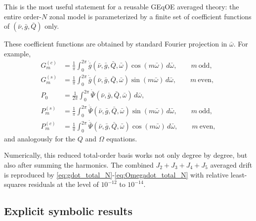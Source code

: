 \documentclass[11pt]{article}
\begin{document}
This is the most useful statement for a reusable GEqOE averaged theory: the
entire order-$N$ zonal model is parameterized by a finite set of coefficient
functions of $(\bar\nu,\bar g,\bar Q)$ only.

These coefficient functions are obtained by standard Fourier projection in
$\bar\omega$. For example,
\begin{align}
G^{(c)}_m
&=
\frac{1}{\pi}\int_0^{2\pi}
\dot{\bar g}(\bar\nu,\bar g,\bar Q,\bar\omega)\cos(m\bar\omega)\,d\bar\omega,
\qquad m\ \text{odd},
\label{eq:Gc_proj}\\
G^{(s)}_m
&=
\frac{1}{\pi}\int_0^{2\pi}
\dot{\bar g}(\bar\nu,\bar g,\bar Q,\bar\omega)\sin(m\bar\omega)\,d\bar\omega,
\qquad m\ \text{even},
\label{eq:Gs_proj}\\
P_0
&=
\frac{1}{2\pi}\int_0^{2\pi}
\dot{\bar\Psi}(\bar\nu,\bar g,\bar Q,\bar\omega)\,d\bar\omega,
\label{eq:P0_proj}\\
P^{(s)}_m
&=
\frac{1}{\pi}\int_0^{2\pi}
\dot{\bar\Psi}(\bar\nu,\bar g,\bar Q,\bar\omega)\sin(m\bar\omega)\,d\bar\omega,
\qquad m\ \text{odd},
\label{eq:Ps_proj}\\
P^{(c)}_m
&=
\frac{1}{\pi}\int_0^{2\pi}
\dot{\bar\Psi}(\bar\nu,\bar g,\bar Q,\bar\omega)\cos(m\bar\omega)\,d\bar\omega,
\qquad m\ \text{even},
\label{eq:Pc_proj}
\end{align}
and analogously for the $Q$ and $\Omega$ equations.

Numerically, this reduced total-order basis works not only degree by degree,
but also after summing the harmonics. The combined
$J_2+J_3+J_4+J_5$ averaged drift is reproduced by
\eqref{eq:gdot_total_N}-\eqref{eq:Omegadot_total_N} with relative least-squares
residuals at the level of $10^{-12}$ to $10^{-14}$.

\subsection{Explicit symbolic results}
\end{document}
